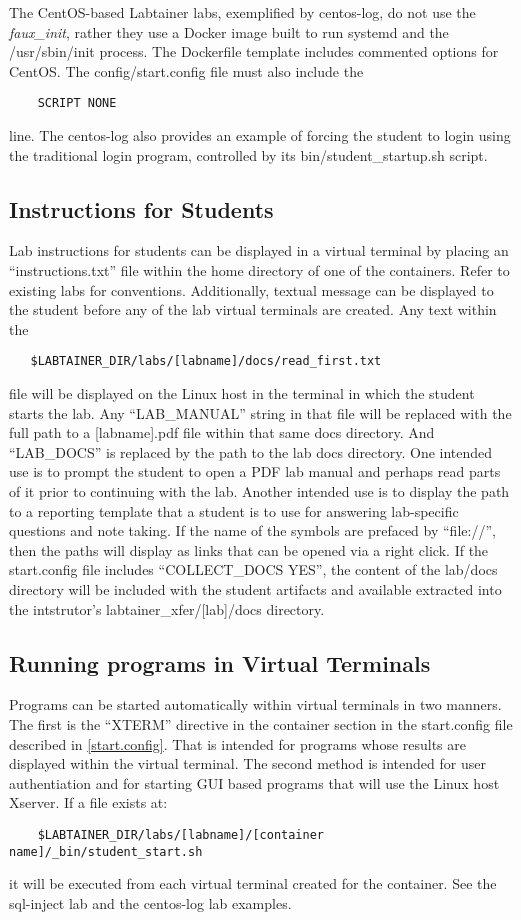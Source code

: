 \documentclass[12pt]{article}
\begin{document}
The CentOS-based Labtainer labs, exemplified by centos-log, do not use the \textit{faux\_init}, rather they
use a Docker image built to run systemd and the /usr/sbin/init process.  The Dockerfile template includes
commented options for CentOS.  The config/start.config file must also include the 
\begin{verbatim}
    SCRIPT NONE
\end{verbatim}
\noindent line.  The centos-log also provides an example of forcing the student to login using the traditional
login program, controlled by its bin/student\_startup.sh script.   


\subsection {Instructions for Students} \label{instructions}
Lab instructions for students can be displayed in a virtual terminal by placing an
``instructions.txt'' file within the home directory of one of the containers.  Refer to existing
labs for conventions.  Additionally, textual message can be displayed to the student before any 
of the lab virtual terminals are created.  Any text within the 
\begin{verbatim}
   $LABTAINER_DIR/labs/[labname]/docs/read_first.txt
\end{verbatim}
\noindent file will be displayed on the Linux host in the terminal in which the student
starts the lab.  Any ``LAB\_MANUAL'' string in that file will be replaced with the full path
to a [labname].pdf file within that same docs directory.  And ``LAB\_DOCS'' is replaced by the
path to the lab docs directory.  One intended use is to prompt the
student to open a PDF lab manual and perhaps read parts of it prior to continuing with the lab.
Another intended use is to display the path to a reporting template that a student is to use
for answering lab-specific questions and note taking.  If the name of the symbols are prefaced
by ``file://'', then the paths will display as links that can be opened via a right click.
If the start.config file includes ``COLLECT\_DOCS YES'', the content of the lab/docs directory will be
included with the student artifacts and available extracted into the intstrutor's 
labtainer\_xfer/[lab]/docs directory.

\subsection {Running programs in Virtual Terminals}
Programs can be started automatically within virtual terminals in two manners.
The first is the ``XTERM'' directive in the container section in the start.config file
described in \ref{start.config}.  That is intended for programs whose results are displayed
within the virtual terminal.  The second method is intended for user authentiation and
for starting GUI based programs
that will use the Linux host Xserver.  If a file exists at:
\begin{verbatim}
    $LABTAINER_DIR/labs/[labname]/[container name]/_bin/student_start.sh
\end{verbatim}
it will be executed from each virtual terminal created for the container.
See the sql-inject lab and the centos-log lab examples.
\end{document}
